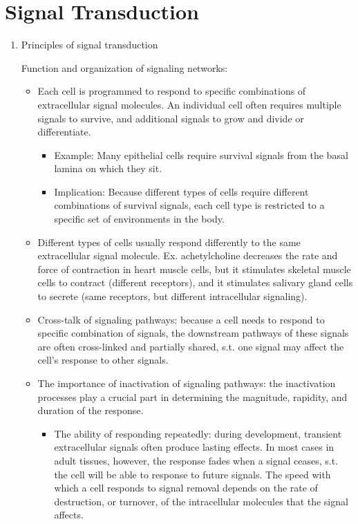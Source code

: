 \documentclass{report}
\begin{document}
\section{Signal Transduction}
\begin{enumerate}

\item{Principles of signal transduction} 

Function and organization of signaling networks: 
\begin{itemize}
\item Each cell is programmed to respond to specific combinations of extracellular signal molecules. An individual cell often requires multiple signals to survive, and additional signals to grow and divide or differentiate. 
\begin{itemize}
	\item Example: Many epithelial cells require survival signals from the basal lamina on which they sit. 
	\item Implication: Because different types of cells require different combinations of survival signals, each cell type is restricted to a specific set of environments in the body.
\end{itemize}

\item Different types of cells usually respond differently to the same extracellular signal molecule. Ex. achetylcholine decreases the rate and force of contraction in heart muscle cells, but it stimulates skeletal muscle cells to contract (different receptors), and it stimulates salivary gland cells to secrete (same receptors, but different intracellular signaling). 

\item Cross-talk of signaling pathways: because a cell needs to respond to specific combination of signals, the downstream pathways of these signals are often cross-linked and partially shared, s.t. one signal may affect the cell's response to other signals. 

\item The importance of inactivation of signaling pathways: the inactivation processes play a crucial part in determining the magnitude, rapidity, and duration of the response.
\begin{itemize}
\item The ability of responding repeatedly: during development, transient extracellular signals often produce lasting effects. In most cases in adult tissues, however, the response fades when a signal ceases, s.t. the cell will be able to response to future signals. The speed with which a cell responds to signal removal depends on the rate of destruction, or turnover, of the intracellular molecules that the signal affects.


\end{itemize}
\end{itemize}
\end{enumerate}
\end{document}
